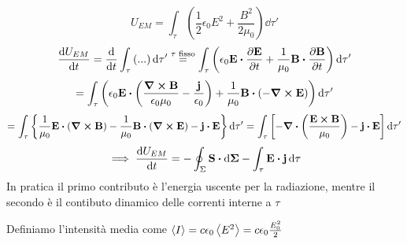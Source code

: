 \documentclass[12pt,a4paper]{article}
\begin{document}
\begin{equation*}
    U_{EM}= \int_\tau\left( \frac{1}{2}\epsilon_0E^2 + \frac{B^2}{2\mu_0} \right)\dd{\tau'}
\end{equation*}
\begin{equation*}
    \dv{U_{EM}}{t}= \dv{}{t}\int_\tau\left( ... \right)\dd{\tau'}\overset{\tau \text{ fisso}}{=}
    \int_\tau\left( \epsilon_0 \vb{E}\vdot\pdv{\vb{E}}{t}+ \frac{1}{\mu_0}\vb{B}\vdot\pdv{\vb{B}}{t}\right)\dd{\tau'}
\end{equation*}
\begin{equation*}
    =\int_\tau\left( \epsilon_0\vb{E}\vdot\left( \frac{\curl{\vb{B}}}{\epsilon_0\mu_0} -\frac{\vb{j}}{\epsilon_0} \right) + 
    \frac{1}{\mu_0}\vb{B}\vdot\left( - \curl{\vb{E}} \right) \right)\dd{\tau'}
\end{equation*}
\begin{equation*}
    = \int_\tau\left\{ \frac{1}{\mu_0}\vb{E}\vdot\left( \curl{\vb{B}} \right)-\frac{1}{\mu_0}\vb{B}\vdot\left( \curl{\vb{E}} \right)- \vb{j}\vdot\vb{E} \right\}\dd{\tau'}
    = \int_\tau \left[ - \div(\frac{\vb{E}\cp\vb{B}}{\mu_0})-\vb{j}\vdot\vb{E} \right]\dd{\tau'}
\end{equation*}
\begin{equation*}
    \implies\dv{U_{EM}}{t}= -\oint_\Sigma \vb{S}\vdot\dd{\vb{\Sigma}}-\int_\tau\vb{E}\vdot\vb{j}\dd{\tau}
\end{equation*}
In pratica il primo contributo è l'energia uscente per la radiazione, mentre il secondo è il contibuto dinamico delle correnti interne a $\tau$

Definiamo l'intensità media come $\expval{I}= c\epsilon_0\expval{E^2}= c \epsilon_0\frac{E_0^2}{2}$
\end{document}

